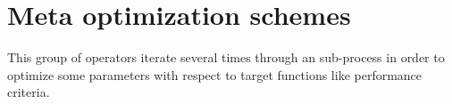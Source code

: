 \section{Meta optimization schemes}

This group of operators iterate several times through an sub-process in order to
optimize some parameters with respect to target functions like performance
criteria.
